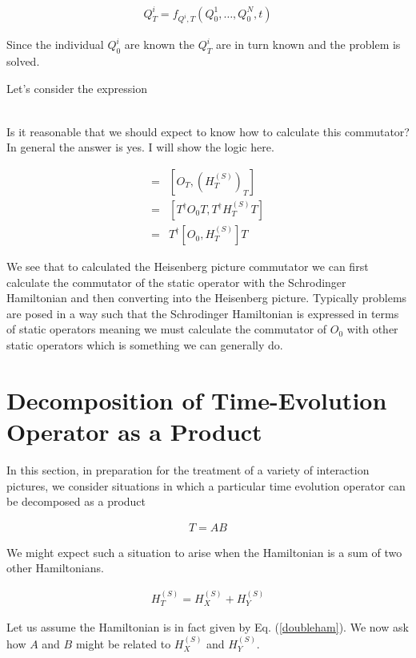 \documentclass[12pt]{article}
\begin{document}
\begin{align}
Q^i_T = f_{Q^i, T}(Q^1_0, \ldots, Q^N_0, t)
\end{align}

Since the individual $Q^i_0$ are known the $Q^i_T$ are in turn known and the problem is solved.

Let's consider the expression

\begin{align}
[O_T, H_T^{(H)}]
\end{align}

Is it reasonable that we should expect to know how to calculate this commutator?
In general the answer is yes.
I will show the logic here.

\begin{align}
[O_T, H_T^{(H)}] =& [O_T, \left(H_T^{(S)}\right)_T] \nonumber\\
=&[T^{\dag}O_0T, T^{\dag}H_T^{(S)}T] \nonumber\\
=&T^{\dag}[O_0, H_T^{(S)}]T
\end{align}

We see that to calculated the Heisenberg picture commutator we can first calculate the commutator of the static operator with the Schrodinger Hamiltonian and then converting into the Heisenberg picture.
Typically problems are posed in a way such that the Schrodinger Hamiltonian is expressed in terms of static operators meaning we must calculate the commutator of $O_0$ with other static operators which is something we can generally do.

\section{Decomposition of Time-Evolution Operator as a Product}

In this section, in preparation for the treatment of a variety of interaction pictures, we consider situations in which a particular time evolution operator can be decomposed as a product

\begin{align}
T = AB
\end{align}

We might expect such a situation to arise when the Hamiltonian is a sum of two other Hamiltonians.

\begin{align}
\label{doubleham}
H_T^{(S)} = H_X^{(S)} + H_Y^{(S)}
\end{align}

Let us assume the Hamiltonian is in fact given by Eq. (\ref{doubleham}). 
We now ask how $A$ and $B$ might be related to $H_X^{(S)}$ and $H_Y^{(S)}$.
\end{document}
